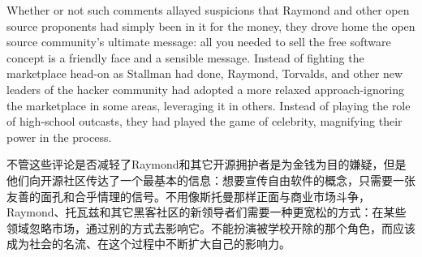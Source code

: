 \ifdefined\eng
Whether or not such comments allayed suspicions that Raymond and other open source proponents had simply been in it for the money, they drove home the open source community's ultimate message: all you needed to sell the free software concept is a friendly face and a sensible message. Instead of fighting the marketplace head-on as Stallman had done, Raymond, Torvalds, and other new leaders of the hacker community had adopted a more relaxed approach-ignoring the marketplace in some areas, leveraging it in others. Instead of playing the role of high-school outcasts, they had played the game of celebrity, magnifying their power in the process.
\fi

\ifdefined\chs
不管这些评论是否减轻了Raymond和其它开源拥护者是为金钱为目的嫌疑，但是他们向开源社区传达了一个最基本的信息：想要宣传自由软件的概念，只需要一张友善的面孔和合乎情理的信号。不用像斯托曼那样正面与商业市场斗争，Raymond、托瓦兹和其它黑客社区的新领导者们需要一种更宽松的方式：在某些领域忽略市场，通过别的方式去影响它。不能扮演被学校开除的那个角色，而应该成为社会的名流、在这个过程中不断扩大自己的影响力。
\fi





